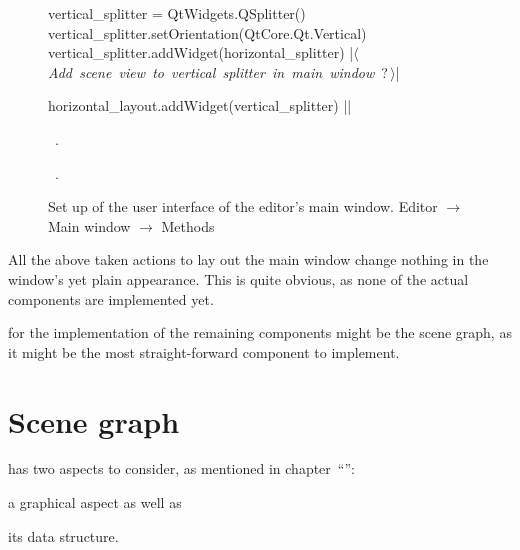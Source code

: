 \documentclass[%
    a4paper,    %
    justified,  %
    nobib,      %
    openany     %
]{tufte-book}
\begin{document}
\begin{figure}
\begin{flushleft}
\begin{minipage}{\linewidth}
\begin{pythoncode}
    vertical_splitter = QtWidgets.QSplitter()
    vertical_splitter.setOrientation(QtCore.Qt.Vertical)
    vertical_splitter.addWidget(horizontal_splitter)
    |\hbox{$\langle\,${\itshape Add scene view to vertical splitter in main window}\nobreak\ {\footnotesize ?}$\,\rangle$}|

    horizontal_layout.addWidget(vertical_splitter)
|\NWsep|
\end{pythoncode}
\vspace{1.5ex}
\footnotesize
\begin{list}{}{\setlength{\itemsep}{-\parsep}\setlength{\itemindent}{-\leftmargin}}
\item \NWtxtMacroDefBy\ .
\item \NWtxtMacroRefIn\ .

\item{}
\end{list}
\end{minipage}\vspace{4ex}
\end{flushleft}
\caption{Set up of the user interface of the editor's  main window.
  \newline{}\newline{}Editor $\rightarrow$ Main window
  $\rightarrow$ Methods}
\label{editor:lst:main-window:methods:setup-ui}
\end{figure}

All the above taken actions to lay out the main window change nothing in the
window's yet plain appearance. This is quite obvious, as none of the actual
components are implemented yet.

 for the implementation of the remaining
components might be the scene graph, as it might be the most straight-forward
component to implement.

\chapter{Scene graph}
\label{appendix:chap:scene-graph}

 has two aspects to consider, as mentioned
in chapter~\enquote{}:
\begin{enumerate*}
  \item a graphical aspect as well as
  \item its data structure.
\end{enumerate*}
\end{document}

